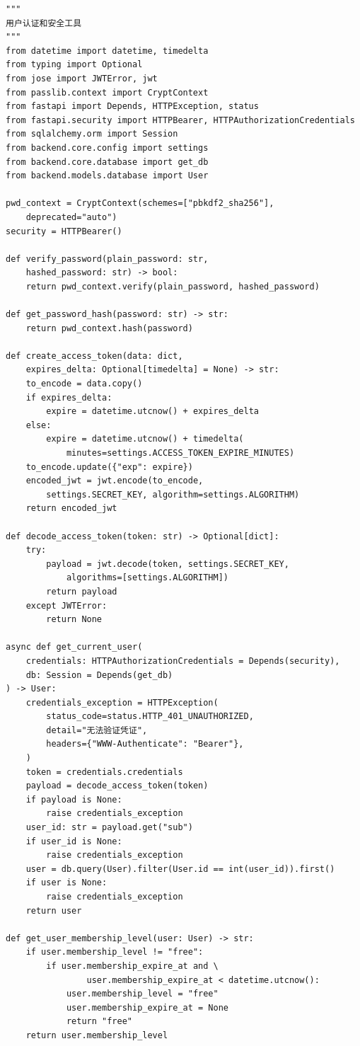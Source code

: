 \documentclass[a4paper,10pt]{article}
\begin{document}
\begin{lstlisting}
"""
用户认证和安全工具
"""
from datetime import datetime, timedelta
from typing import Optional
from jose import JWTError, jwt
from passlib.context import CryptContext
from fastapi import Depends, HTTPException, status
from fastapi.security import HTTPBearer, HTTPAuthorizationCredentials
from sqlalchemy.orm import Session
from backend.core.config import settings
from backend.core.database import get_db
from backend.models.database import User

pwd_context = CryptContext(schemes=["pbkdf2_sha256"],
    deprecated="auto")
security = HTTPBearer()

def verify_password(plain_password: str,
    hashed_password: str) -> bool:
    return pwd_context.verify(plain_password, hashed_password)

def get_password_hash(password: str) -> str:
    return pwd_context.hash(password)

def create_access_token(data: dict,
    expires_delta: Optional[timedelta] = None) -> str:
    to_encode = data.copy()
    if expires_delta:
        expire = datetime.utcnow() + expires_delta
    else:
        expire = datetime.utcnow() + timedelta(
            minutes=settings.ACCESS_TOKEN_EXPIRE_MINUTES)
    to_encode.update({"exp": expire})
    encoded_jwt = jwt.encode(to_encode,
        settings.SECRET_KEY, algorithm=settings.ALGORITHM)
    return encoded_jwt

def decode_access_token(token: str) -> Optional[dict]:
    try:
        payload = jwt.decode(token, settings.SECRET_KEY,
            algorithms=[settings.ALGORITHM])
        return payload
    except JWTError:
        return None

async def get_current_user(
    credentials: HTTPAuthorizationCredentials = Depends(security),
    db: Session = Depends(get_db)
) -> User:
    credentials_exception = HTTPException(
        status_code=status.HTTP_401_UNAUTHORIZED,
        detail="无法验证凭证",
        headers={"WWW-Authenticate": "Bearer"},
    )
    token = credentials.credentials
    payload = decode_access_token(token)
    if payload is None:
        raise credentials_exception
    user_id: str = payload.get("sub")
    if user_id is None:
        raise credentials_exception
    user = db.query(User).filter(User.id == int(user_id)).first()
    if user is None:
        raise credentials_exception
    return user

def get_user_membership_level(user: User) -> str:
    if user.membership_level != "free":
        if user.membership_expire_at and \
                user.membership_expire_at < datetime.utcnow():
            user.membership_level = "free"
            user.membership_expire_at = None
            return "free"
    return user.membership_level


\end{lstlisting}
\end{document}
